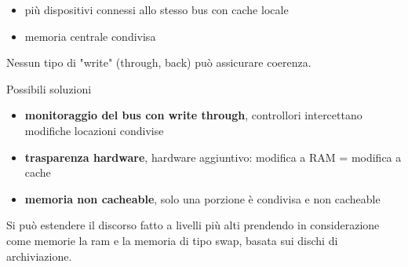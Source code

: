 \documentclass[12pt, a4paper]{article}
\begin{document}
\begin{esem}
\begin{itemize}
	\item più dispositivi connessi allo stesso bus con cache locale
	\item memoria centrale condivisa
\end{itemize}
Nessun tipo di "write" (through, back) può assicurare coerenza.
\end{esem}
Possibili soluzioni



\begin{itemize}
	\item \textbf{monitoraggio del bus con write through}, controllori intercettano modifiche locazioni condivise
	\item \textbf{trasparenza hardware}, hardware aggiuntivo: modifica a RAM = modifica a cache
	\item \textbf{memoria non cacheable}, solo una porzione è condivisa e non cacheable
\end{itemize}
Si può estendere il discorso fatto a livelli più alti prendendo in considerazione come memorie la ram e la memoria di tipo swap, basata sui dischi di archiviazione. 
\end{document}
